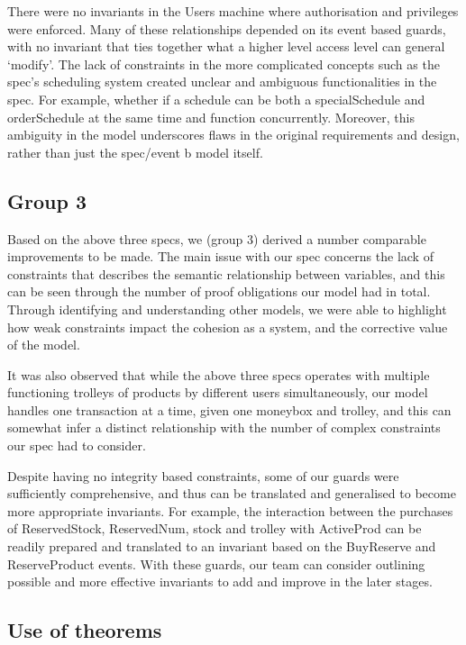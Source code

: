 There were no invariants in the Users machine where authorisation and privileges were enforced. Many of these relationships depended on its event based guards, with no invariant that ties together what a higher level access level can general ‘modify’. The lack of constraints in the more complicated concepts such as the spec’s scheduling system created unclear and ambiguous functionalities in the spec. For example, whether if a schedule can be both a specialSchedule and orderSchedule at the same time and function concurrently. Moreover, this ambiguity in the model underscores flaws in the original requirements and design, rather than just the spec\slash event b model itself.

\subsection{Group 3}
\label{group3}

Based on the above three specs, we (group 3) derived a number comparable improvements to be made. The main issue with our spec concerns the lack of constraints that describes the semantic relationship between variables, and this can be seen through the number of proof obligations our model had in total. Through identifying and understanding other models, we were able to highlight how weak constraints impact the cohesion as a system, and the corrective value of the model.

It was also observed that while the above three specs operates with multiple functioning trolleys of products by different users simultaneously, our model handles one transaction at a time, given one moneybox and trolley, and this can somewhat infer a distinct relationship with the number of complex constraints our spec had to consider.

Despite having no integrity based constraints, some of our guards were sufficiently comprehensive, and thus can be translated and generalised to become more appropriate invariants. For example, the interaction between the purchases of ReservedStock, ReservedNum, stock and trolley with ActiveProd can be readily prepared and translated to an invariant based on the BuyReserve and ReserveProduct events. With these guards, our team can consider outlining possible and more effective invariants to add and improve in the later stages.

\subsection{Use of theorems}
\label{useoftheorems}

